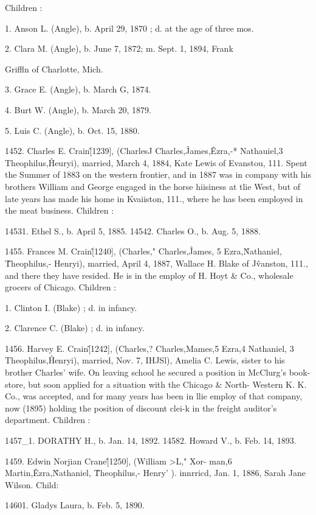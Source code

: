 \documentclass{book}
\begin{document}
Children : 

1. Anson L. (Angle), b. April 29, 1870 ; d. at the age of three mos. 

2. Clara M. (Angle), b. June 7, 1872; m. Sept. 1, 1894, Frank 

Griffln of Charlotte, Mich. 




3. Grace E. (Angle), b. March G, 1874. 

4. Burt W. (Angle), b. March 20, 1879. 

5. Luis C. (Angle), b. Oct. 15, 1880. 

1452. Charles E. Crain\^ [1239], (CharlesJ Charles,\^ James,\^ 
Ezra,-* Nathauiel,3 Theophilus,\^ Heuryi), married, March 4, 
1884, Kate Lewis of Evanstou, 111. Spent the Summer of 1883 
on the western frontier, and in 1887 was in company with his 
brothers William and George engaged in the horse hiisiness at tlie 
West, but of late years has made his home in Kvaiiston, 111., 
where he has been employed in the meat business. Children : 

14531. Ethel S., b. April 5, 1885. 
14542. Charles O., b. Aug. 5, 1888. 

1455. Frances M. Crain\^ [1240], (Charles," Charles,\^ 
James, 5 Ezra,\^ Nathaniel, \^ Theophilus,- Henryi), married, April 
4, 1887, Wallace H. Blake of J\^vanston, 111., and there they have 
resided. He is in the employ of H. Hoyt \& Co., wholesale 
grocers of Chicago. Children : 

1. Clinton I. (Blake) ; d. in infancy. 

2. Clarence C. (Blake) ; d. in infancy. 

1456. Harvey E. Crain\^ [1242], (Charles,? Charles,Mames,5 
Ezra,4 Nathaniel, 3 Theophilus,\^ Henryi), married, Nov. 7, IHJSl), 
Amelia C. Lewis, sister to his brother Charles' wife. On leaving 
school he secured a position in McClurg's book-store, but soon 
applied for a situation with the Chicago \& North- Western K. K. 
Co., was accepted, and for many years has been in llie employ of 
that company, now (1895) holding the position of discount clei-k 
in the freight auditor's department. Children : 

1457\_1. DORATHY H., b. Jan. 14, 1892. 
14582. Howard V., b. Feb. 14, 1893. 

1459. Edwin Norjian Crane\^ [1250], (William >L," Xor- 
man,6 Martin,\^ Ezra,\^ Nathaniel, \^ Theophilus,- Henry' ). innrricd, 
Jan. 1, 1886, Sarah Jane Wilson. Child: 

14601. Gladys Laura, b. Feb. 5, 1890. 
\end{document}
